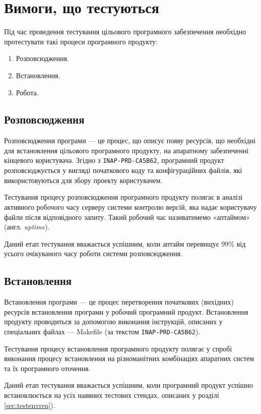 \documentclass[a4paper,oneside,DIV=12,12pt]{scrartcl}
\begin{document}
    \section{Вимоги, що тестуються}
		Під час проведення тестування цільового програмного забезпечення необхідно протестувати такі процеси програмного продукту:
		\begin{enumerate}
			\item Розповсюдження.
			\item Встановлення.
			\item Робота.
		\end{enumerate}
		
		\subsection{Розповсюдження}
			Розповсюдження програми --- це процес, що описує появу ресурсів, що необхідні для встановлення цільового програмного продукту, на апаратному забезпеченні кінцевого користувача. Згідно з \texttt{INAP-PRD-CA5B62}, програмний продукт розповсюджується у вигляді початкового коду та конфігураційних файлів, які використовуються для збору проекту користувачем.
			
			Тестування процесу розповсюдження програмного продукту полягає в аналізі активного робочого часу серверу системи контролю версій, яка надає користувачу файли після відповідного запиту. Такий робочий час називатимемо «аптаймом» (англ. \emph{uptime}).
			
			Даний етап тестування вважається успішним, коли аптайм перевищує 99\% від усього очікуваного часу роботи системи розповсюдження.
			
		\subsection{Встановлення}
			Встановлення програми --- це процес перетворення початкових (вихідних) ресурсів встановлення програми у робочий програмний продукт. Встановлення продукту проводиться за допомогою виконання інструкцій, описаних у спеціальних файлах --- Makefile (за текстом \texttt{INAP-PRD-CA5B62}).
			
			Тестування процесу встановлення програмного продукту полягає у спробі виконання процесу встановлення на різноманітних комбінаціях апаратних систем та їх програмного оточення.
			
			Даний етап тестування вважається успішним, коли програмний продукт успішно встановлюється на усіх наявних тестових стендах, описаних у розділі \ref{sec:testenvreq}).
			
\end{document}
